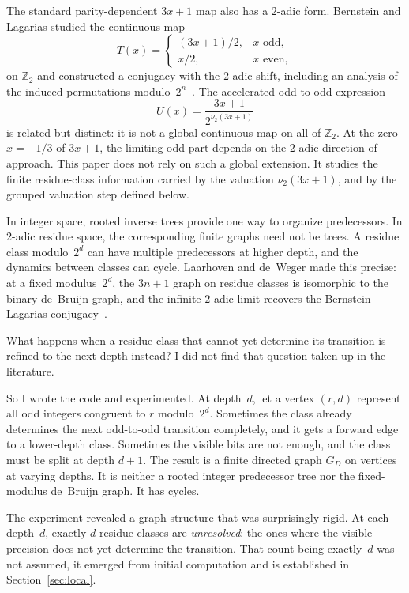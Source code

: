 \documentclass[11pt]{amsart}
\theoremstyle{definition}
\theoremstyle{remark}
\begin{document}
The standard parity-dependent $3x+1$ map also has a $2$-adic form.  Bernstein
and Lagarias studied the continuous map
\[
T(x)=
\begin{cases}
(3x+1)/2, & x\text{ odd},\\
x/2, & x\text{ even},
\end{cases}
\]
on $\mathbb Z_2$ and constructed a conjugacy with the $2$-adic shift, including
an analysis of the induced permutations modulo~$2^n$~\cite{Bernstein1994,
BernsteinLagarias1996}.  The accelerated odd-to-odd expression
\[
U(x)=\frac{3x+1}{2^{\nu_2(3x+1)}}
\]
is related but distinct: it is not a global continuous map on all of
$\mathbb Z_2$.  At the zero $x=-1/3$ of $3x+1$, the limiting odd part
depends on the $2$-adic direction of approach.  This paper does not rely on
such a global extension.  It studies the finite residue-class information
carried by the valuation $\nu_2(3x+1)$, and by the grouped valuation step
defined below.

In integer space, rooted inverse trees provide one way to organize
predecessors.  In $2$-adic residue space, the corresponding finite graphs need
not be trees.  A residue class modulo~$2^d$ can have multiple predecessors at
higher depth, and the dynamics between classes can cycle.  Laarhoven and
de~Weger made this precise: at a fixed modulus~$2^d$, the $3n+1$ graph on
residue classes is isomorphic to the binary de~Bruijn graph, and the infinite
$2$-adic limit recovers the Bernstein--Lagarias
conjugacy~\cite{LaarhovenDeWeger2013}.

What happens when a residue class that cannot yet determine its transition is
refined to the next depth instead?  I did not find that question taken up in
the literature.

So I wrote the code and experimented.  At depth~$d$, let a vertex $(r,d)$ represent all odd
integers congruent to $r$ modulo~$2^d$.  Sometimes the class already
determines the next odd-to-odd transition completely, and it gets a forward
edge to a lower-depth class.  Sometimes the visible bits are not enough, and
the class must be split at depth $d+1$.  The result is a finite directed graph
$G_D$ on vertices at varying depths.  It is neither a rooted integer predecessor tree nor
the fixed-modulus de~Bruijn graph.  It has cycles.

The experiment revealed a graph structure that was surprisingly rigid.  At each 
depth~$d$, exactly $d$ residue classes are \emph{unresolved}: the ones where the visible 
precision does not yet determine the transition.  That count being exactly~$d$ was 
not assumed, it emerged from initial computation and is established in Section~\ref{sec:local}.
\end{document}

